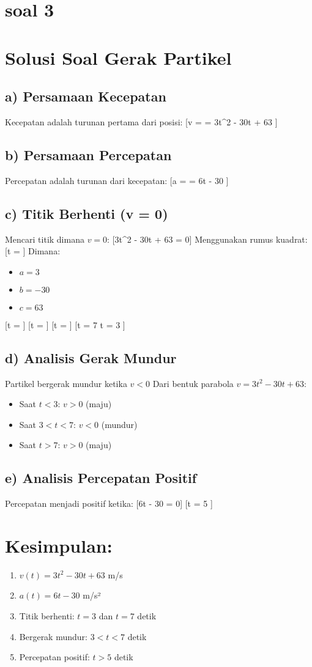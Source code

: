 \documentclass{article}
\begin{document}
\section{ soal 3}
\section*{Solusi Soal Gerak Partikel}
\subsection*{a) Persamaan Kecepatan}
Kecepatan adalah turunan pertama dari posisi:
[v =  = 3t^2 - 30t + 63 ]
\subsection*{b) Persamaan Percepatan}
Percepatan adalah turunan dari kecepatan:
[a =  = 6t - 30 ]
\subsection*{c) Titik Berhenti (v = 0)}
Mencari titik dimana $v = 0$:
[3t^2 - 30t + 63 = 0]
Menggunakan rumus kuadrat:
[t = ]
Dimana:
\begin{itemize}
\item $a = 3$
\item $b = -30$
\item $c = 63$
\end{itemize}
[t = ]
[t = ]
[t = ]
[t = 7  t = 3 ]
\subsection*{d) Analisis Gerak Mundur}
Partikel bergerak mundur ketika $v < 0$
Dari bentuk parabola $v = 3t^2 - 30t + 63$:
\begin{itemize}
\item Saat $t < 3$: $v > 0$ (maju)
\item Saat $3 < t < 7$: $v < 0$ (mundur)
\item Saat $t > 7$: $v > 0$ (maju)
\end{itemize}
\subsection*{e) Analisis Percepatan Positif}
Percepatan menjadi positif ketika:
[6t - 30 = 0]
[t = 5 ]
\section*{Kesimpulan:}
\begin{enumerate}
\item $v(t) = 3t^2 - 30t + 63$ m/s
\item $a(t) = 6t - 30$ m/s²
\item Titik berhenti: $t = 3$ dan $t = 7$ detik
\item Bergerak mundur: $3 < t < 7$ detik
\item Percepatan positif: $t > 5$ detik
\end{enumerate}
\end{document}
